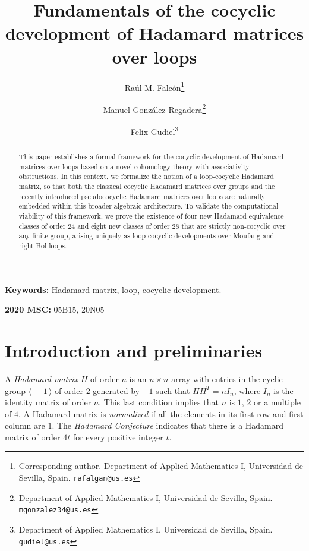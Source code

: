 \documentclass[11pt,a4paper]{article}
\title{Fundamentals of the cocyclic development of Hadamard matrices over loops}
\author{
Ra\'ul M. Falc\'on\thanks{Corresponding author. Department of Applied Mathematics I, Universidad de Sevilla, Spain. \texttt{rafalgan@us.es}}
\and
Manuel Gonz\'alez-Regadera\thanks{Department of Applied Mathematics I, Universidad de Sevilla, Spain. \texttt{mgonzalez34@us.es}}
\and
Felix Gudiel\thanks{Department of Applied Mathematics I, Universidad de Sevilla, Spain. \texttt{gudiel@us.es}}
}
\date{}
\begin{document}
\maketitle

\begin{abstract}
This paper establishes a formal framework for the cocyclic development of Hadamard matrices over loops based on a novel cohomology theory with associativity obstructions. In this context, we formalize the notion of a loop-cocyclic Hadamard matrix, so that both the classical cocyclic Hadamard matrices over groups and the recently introduced pseudococyclic Hadamard matrices over loops are naturally embedded within this broader algebraic architecture. To validate the computational viability of this framework, we prove the existence of four new Hadamard equivalence classes of order 24 and eight new classes of order 28 that are strictly non-cocyclic over any finite group, arising uniquely as loop-cocyclic developments over Moufang and right Bol loops.
\end{abstract}

\noindent\textbf{Keywords:} Hadamard matrix, loop, cocyclic development.

\noindent\textbf{2020 MSC:} 05B15, 20N05

\section{Introduction and preliminaries}
\label{Section:Intro}

A {\em Hadamard matrix} $H$ of order $n$ is an $n\times n$ array with entries in the cyclic group $\langle\,-1\,\rangle$ of order $2$ generated by $-1$ such that $HH^T=nI_n$, where $I_n$ is the identity matrix of order $n$. This last condition implies that $n$ is $1,\,2$ or a multiple of $4$. A Hadamard matrix is {\em normalized} if all the elements in its first row and first column are $1$. The {\em Hadamard Conjecture} indicates that there is a Hadamard matrix of order $4t$ for every positive integer $t$.
\end{document}
